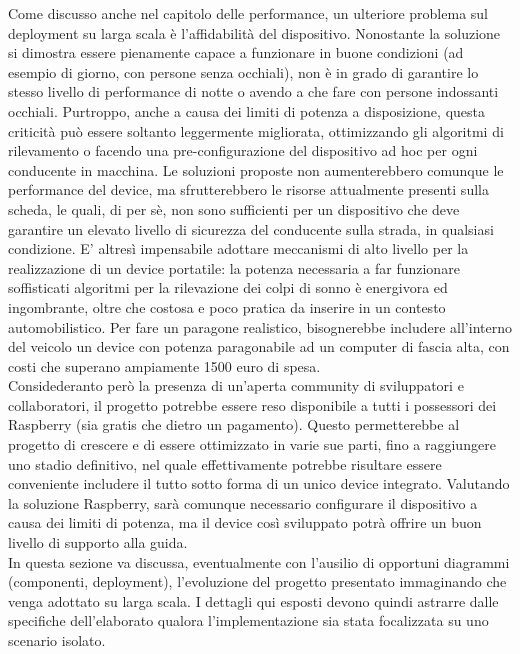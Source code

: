 \documentclass[12pt]{article}
\begin{document}
Come discusso anche nel capitolo delle performance, un ulteriore problema sul deployment su larga scala è l'affidabilità del dispositivo. Nonostante la soluzione si dimostra essere pienamente capace a funzionare in buone condizioni (ad esempio di giorno, con persone senza occhiali), non è in grado di garantire lo stesso livello di performance di notte o avendo a che fare con persone indossanti occhiali. Purtroppo, anche a causa dei limiti di potenza a disposizione, questa criticità può essere soltanto leggermente migliorata, ottimizzando gli algoritmi di rilevamento o facendo una pre-configurazione del dispositivo ad hoc per ogni conducente in macchina. Le soluzioni proposte non aumenterebbero comunque le performance del device, ma sfrutterebbero le risorse attualmente presenti sulla scheda, le quali, di per sè, non sono sufficienti per un dispositivo che deve garantire un elevato livello di sicurezza del conducente sulla strada, in qualsiasi condizione. E' altresì impensabile adottare meccanismi di alto livello per la realizzazione di un device portatile: la potenza necessaria a far funzionare soffisticati algoritmi per la rilevazione dei colpi di sonno è energivora ed ingombrante, oltre che costosa e poco pratica da inserire in un contesto automobilistico. Per fare un paragone realistico, bisognerebbe includere all'interno del veicolo un device con potenza paragonabile ad un computer di fascia alta, con costi che superano ampiamente 1500 euro di spesa.\\

Considederanto però la presenza di un'aperta community di sviluppatori e collaboratori, il progetto potrebbe essere reso disponibile a tutti i possessori dei Raspberry (sia gratis che dietro un pagamento). Questo permetterebbe al progetto di crescere e di essere ottimizzato in varie sue parti, fino a raggiungere uno stadio definitivo, nel quale effettivamente potrebbe risultare essere conveniente includere il tutto sotto forma di un unico device integrato. Valutando la soluzione Raspberry, sarà comunque necessario configurare il dispositivo a causa dei limiti di potenza, ma il device così sviluppato potrà offrire un buon livello di supporto alla guida.\\

In questa sezione va discussa, eventualmente con l'ausilio di opportuni diagrammi (componenti, deployment), l'evoluzione del progetto presentato immaginando che venga adottato su larga scala. I dettagli qui esposti devono quindi astrarre dalle specifiche dell'elaborato qualora l'implementazione sia stata focalizzata su uno scenario isolato.\\
\end{document}
